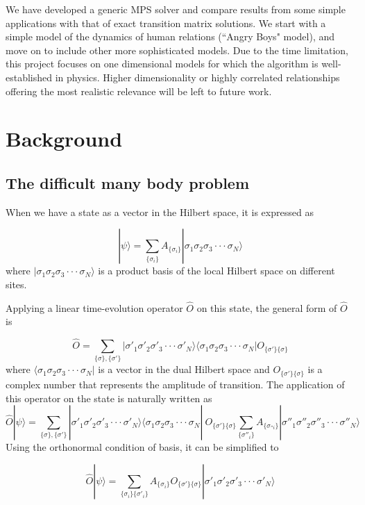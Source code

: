 \documentclass[english]{article}[12pt]
\begin{document}
We have developed  a generic MPS solver and compare results from some simple applications with that of exact transition matrix solutions. We start with a simple model of the dynamics of human relations (``Angry Boys" model), and move on to include other more sophisticated models. Due to the time limitation, this project focuses on one dimensional models for which the algorithm is well-established in physics. Higher dimensionality or highly correlated relationships offering the most realistic relevance will be left to future work.

\section{Background}

\subsection{The difficult many body problem}

When we have a state as a vector in the Hilbert space, it is expressed
as

\[
|\psi\rangle=\sum_{\{\sigma_{i}\}}A_{\{\sigma_{i}\}}|\sigma_{1}\sigma_{2}\sigma_{3}\cdot\cdot\cdot\sigma_{N}\rangle
\]
where $|\sigma_{1}\sigma_{2}\sigma_{3}\cdot\cdot\cdot\sigma_{N}\rangle$
is a product basis of the local Hilbert space on different sites.

Applying a linear time-evolution operator $\hat{O}$ on this state,
the general form of $\hat{O}$ is

\[
\hat{O}=\sum_{\{\sigma\},\{\sigma'\}}|\sigma'_{1}\sigma'_{2}\sigma'_{3}\cdot\cdot\cdot\sigma'_{N}\rangle\langle\sigma_{1}\sigma_{2}\sigma_{3}\cdot\cdot\cdot\sigma_{N}|O_{\{\sigma'\}\{\sigma\}}
\]
where $\langle\sigma_{1}\sigma_{2}\sigma_{3}\cdot\cdot\cdot\sigma_{N}|$ is a vector in the dual Hilbert space and $O_{\{\sigma'\}\{\sigma\}}$ is a complex number that represents the amplitude of transition. The application of this operator on the state is naturally written as
\[
\hat{O}|\psi\rangle=\sum_{\{\sigma\},\{\sigma'\}}|\sigma'_{1}\sigma'_{2}\sigma'_{3}\cdot\cdot\cdot\sigma'_{N}\rangle\langle\sigma_{1}\sigma_{2}\sigma_{3}\cdot\cdot\cdot\sigma_{N}|\ O_{\{\sigma'\}\{\sigma\}}\sum_{\{\sigma''_{i}\}}A_{\{\sigma_{''i}\}}|\sigma''_{1}\sigma''_{2}\sigma''_{3}\cdot\cdot\cdot\sigma''_{N}\rangle
\]
Using the orthonormal condition of basis, it can be simplified to

\[
\hat{O}|\psi\rangle=\sum_{\{\sigma_{i}\}\{\sigma'_{i}\}}A_{\{\sigma_{i}\}}O_{\{\sigma'\}\{\sigma\}}|\sigma'_{1}\sigma'_{2}\sigma'_{3}\cdot\cdot\cdot\sigma'_{N}\rangle
\]
\end{document}
